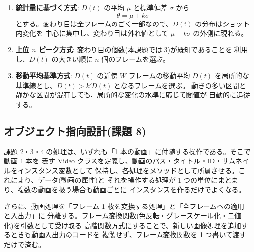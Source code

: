 \begin{enumerate}
\item \textbf{統計量に基づく方式}: $D(t)$ の平均 $\mu$ と標準偏差 $\sigma$ から
\begin{equation}\label{eq:thresh}
\theta = \mu + k \sigma
\end{equation}
とする。変わり目は全フレームのごく一部なので、$D(t)$ の分布はショット内変化を
中心に集中し、変わり目は外れ値として $\mu + k\sigma$ の外側に現れる。
\item \textbf{上位 $n$ ピーク方式}: 変わり目の個数(本課題では 3)が既知であることを
利用し、$D(t)$ の大きい順に $n$ 個のフレームを選ぶ。
\item \textbf{移動平均基準方式}: $D(t)$ の近傍 $W$ フレームの移動平均
$\bar{D}(t)$ を局所的な基準線とし、$D(t) > k' \bar{D}(t)$ となるフレームを選ぶ。
動きの多い区間と静かな区間が混在しても、局所的な変化の水準に応じて閾値が
自動的に追従する。
\end{enumerate}

\subsection{オブジェクト指向設計(課題 8)}

課題 2・3・4 の処理は、いずれも「1 本の動画」に付随する操作である。そこで動画 1 本を
表す Video クラスを定義し、動画のパス・タイトル・ID・サムネイルをインスタンス変数として
保持し、各処理をメソッドとして所属させる。これにより、データ(動画の属性)と
それを操作する処理が 1 つの単位にまとまり、複数の動画を扱う場合も動画ごとに
インスタンスを作るだけでよくなる。

さらに、動画処理を「フレーム 1 枚を変換する処理」と「全フレームへの適用と入出力」に
分離する。フレーム変換関数(色反転・グレースケール化・二値化)を引数として受け取る
高階関数方式にすることで、新しい画像処理を追加するときも動画入出力のコードを
複製せず、フレーム変換関数を 1 つ書いて渡すだけで済む。
